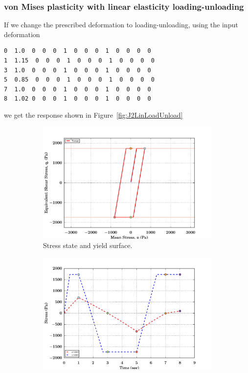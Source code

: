 \subsubsection{von Mises plasticity with linear elasticity loading-unloading} 
If we change the prescribed deformation to loading-unloading, using the input 
deformation
\begin{lstlisting}[language=sh, backgroundcolor=\color{background}]
0  1.0  0  0  0  1  0  0  0  1  0  0  0  0
1  1.15  0  0  0  1  0  0  0  1  0  0  0  0
3  1.0  0  0  0  1  0  0  0  1  0  0  0  0
5  0.85  0  0  0  1  0  0  0  1  0  0  0  0
7  1.0  0  0  0  1  0  0  0  1  0  0  0  0
8  1.02 0  0  0  1  0  0  0  1  0  0  0  0
\end{lstlisting}
we get the response shown in Figure~\ref{fig:J2LinLoadUnload}
\begin{figure}[htbp!]
  \begin{subfigure}{0.5\textwidth}
    \centering
    \includegraphics[width=\textwidth]{MPMMaterials/FIGS/UniaxialStrainLoadUnloadJ2Lin_yield_surface.pdf}
    \caption{Stress state and yield surface.}
  \end{subfigure}
  \begin{subfigure}{0.5\textwidth}
    \centering
    \includegraphics[width=\textwidth]{MPMMaterials/FIGS/UniaxialStrainLoadUnloadJ2Lin_pq_time.pdf}

\end{subfigure}
\end{figure}
